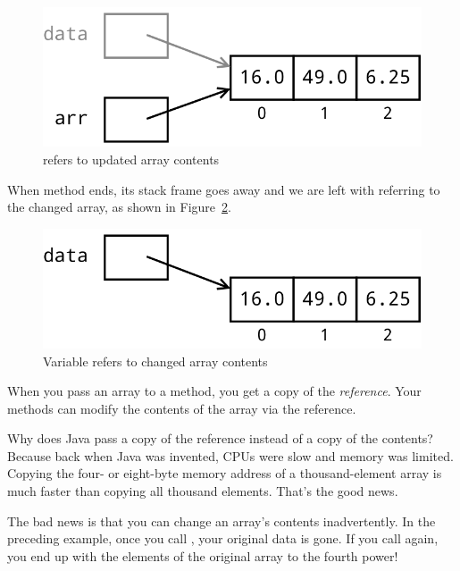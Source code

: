 \begin{figure}[!h]
\begin{center}
\includegraphics[scale=0.5]{figs/ch07/pass_to_array2.png}
\caption{ refers to updated array contents}
\label{fig.passArray2}
\end{center}
\end{figure}

When method  ends, its stack frame goes away and we are left with  referring to the changed array, as shown in Figure~\ref{fig.passArray3}.

\begin{figure}[!h]
\begin{center}
\includegraphics[scale=0.5]{figs/ch07/pass_to_array3.png}
\caption{Variable  refers to changed array contents}
\label{fig.passArray3}
\end{center}
\end{figure}

When you pass an array to a method, you get a copy of the {\em reference}. Your methods can modify the contents of the array via the reference.

Why does Java pass a copy of the reference instead of a copy of the contents? Because back when Java was invented, CPUs were slow and memory was limited. Copying the four- or eight-byte memory address of a thousand-element array is much faster than copying all thousand elements. That's the good news.

The bad news is that you can change an array's contents inadvertently. In the preceding example, once you call , your original data is gone. If you call  again, you end up with the elements of the original array to the fourth power!

